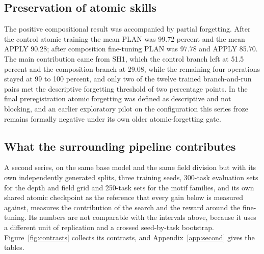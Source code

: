 \documentclass{zapiski}
\begin{document}
\subsection{Preservation of atomic skills}

The positive compositional result was accompanied by partial forgetting. After the
control atomic training the mean PLAN was 99.72 percent and the mean APPLY 90.28; after
composition fine-tuning PLAN was 97.78 and APPLY 85.70. The main contribution came from
SH1, which the control branch left at 51.5 percent and the composition branch at 29.08,
while the remaining four operations stayed at 99 to 100 percent, and only two of the twelve trained
branch-and-run pairs met the descriptive forgetting threshold of two percentage points.
In the final preregistration atomic forgetting was defined as descriptive and not
blocking, and an earlier exploratory pilot on the configuration this series froze
remains formally negative under its own older atomic-forgetting gate.

\subsection{What the surrounding pipeline contributes}
\label{sec:second}

A second series, on the same base model and the same field division but with its own
independently generated splits, three training seeds, 300-task evaluation sets for the
depth and field grid and 250-task sets for the motif families, and its own shared
atomic checkpoint as the reference that every gain below is measured against,
measures the contribution of the search and the reward around the fine-tuning. Its
numbers are not comparable with the intervals above, because it uses a different
unit of replication and a crossed seed-by-task bootstrap.
Figure~\ref{fig:contrasts} collects its contrasts, and Appendix~\ref{app:second}
gives the tables.
\end{document}
